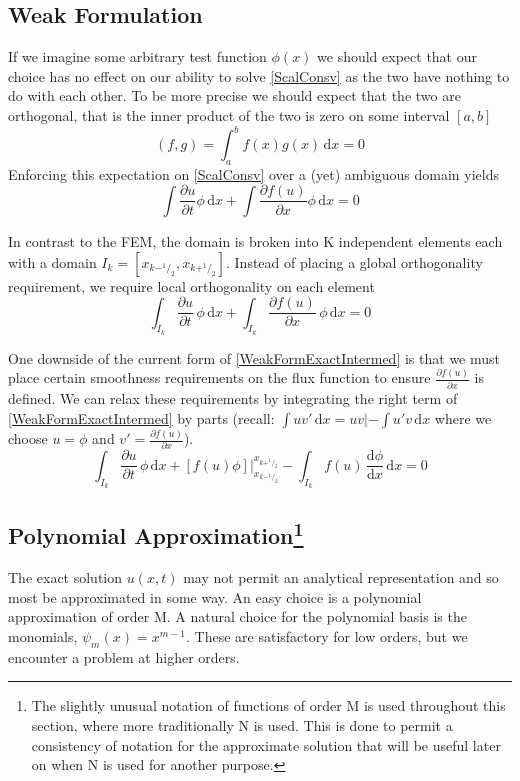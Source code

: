 \documentclass[letterpaper]{article}
\begin{document}
\subsection{Weak Formulation}
If we imagine some arbitrary test function $\phi(x)$ we should expect that our choice has no effect on our ability to solve \eqref{ScalConsv} as the two have nothing to do with each other. To be more precise we should expect that the two are orthogonal, that is the inner product of the two is zero on some interval $[a,b]$
	\begin{equation}\label{InnerProd}
	(f,g) = \int_a^b \! f(x)g(x) \, \mathrm{d}x = 0
	\end{equation}
Enforcing this expectation on \eqref{ScalConsv} over a (yet) ambiguous domain yields
	\begin{equation}\label{WeakFormGlobal}
	\int\! \frac{\partial u}{\partial t} \phi \,\mathrm{d}x + \int\! \frac{\partial f(u)}{\partial x} \phi \,\mathrm{d}x = 0
	\end{equation}

In contrast to the FEM, the domain is broken into K independent elements each with a domain $I_k =[x_{k-^1\!/_2},x_{k+^1\!/_2}]$. Instead of placing a global orthogonality requirement, we require local orthogonality on each element
	\begin{equation}\label{WeakFormExactIntermed}
	\int_{I_k}\! \frac{\partial u}{\partial t} \,\phi \,\mathrm{d}x + \int_{I_k}\! \frac{\partial f(u)}{\partial x} \,\phi \,\mathrm{d}x = 0
	\end{equation}

One downside of the current form of \eqref{WeakFormExactIntermed} is that we must place certain smoothness requirements on the flux function to ensure $\frac{\partial f(u)}{\partial x}$ is defined. We can relax these requirements by integrating the right term of \eqref{WeakFormExactIntermed} by parts (recall: $\int uv' \,\mathrm{d}x = uv| - \int u'v \,\mathrm{d}x$ where we choose $u=\phi$ and $v'=\frac{\partial f(u)}{\partial x}$).
	\begin{equation}\label{WeakFormExact}
	\int_{I_k}\! \frac{\partial u}{\partial t} \,\phi \,\mathrm{d}x +
	[f(u)\phi] \Big\rvert_{x_{k-^1\!/_2}}^{x_{k+^1\!/_2}} -
	\int_{I_k}\! f(u) \,\frac{\mathrm{d} \phi}{\mathrm{d} x} \,\mathrm{d}x = 0
	\end{equation}

\subsection[Polynomial Approximation]
{Polynomial Approximation\footnote{The slightly unusual notation of functions of order M is used throughout this section, where more traditionally N is used. This is done to permit a consistency of notation for the approximate solution that will be useful later on when N is used for another purpose.} }
The exact solution $u(x,t)$ may not permit an analytical representation and so most be approximated in some way. An easy choice is a polynomial approximation of order M. A natural choice for the polynomial basis is the monomials, $\psi_m(x) = x^{m-1}$. These are satisfactory for low orders, but we encounter a problem at higher orders.
\end{document}

